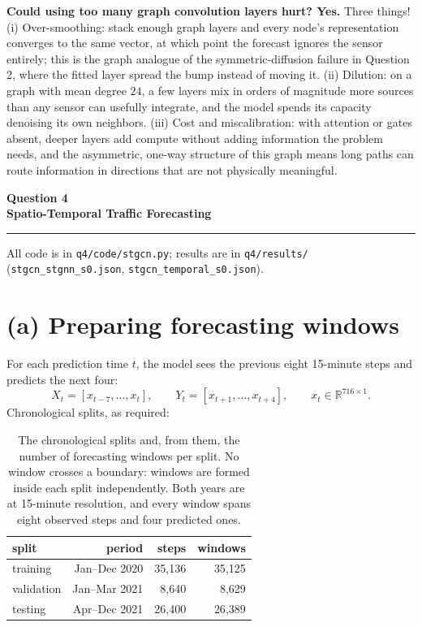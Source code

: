 \documentclass[11pt,letterpaper]{article}
\newcommand{\taskbanner}[2]{\begin{center}{\small\bfseries #1}\\[3pt]{\Large\bfseries #2}\end{center}\vspace{2pt}\hrule\vspace{8pt}}
\begin{document}
\textbf{Could using too many graph convolution layers hurt? Yes.} Three things! (i) Over-smoothing: stack enough graph layers and every node's representation
converges to the same vector, at which point the forecast ignores the sensor entirely; this is
the graph analogue of the symmetric-diffusion failure in Question 2, where the fitted layer
spread the bump instead of moving it. (ii) Dilution: on a graph with mean degree $24$, a few
layers mix in orders of magnitude more sources than any sensor can usefully integrate, and
the model spends its capacity denoising its own neighbors. (iii) Cost and miscalibration:
with attention or gates absent, deeper layers add compute without adding information the
problem needs, and the asymmetric, one-way structure of this graph means long paths can route
information in directions that are not physically meaningful.

\newpage

\taskbanner{Question 4}{Spatio-Temporal Traffic Forecasting}

All code is in \texttt{q4/code/stgcn.py}; results are in \texttt{q4/results/}
(\texttt{stgcn\_stgnn\_s0.json}, \texttt{stgcn\_temporal\_s0.json}).

\section*{(a) Preparing forecasting windows}

For each prediction time $t$, the model sees the previous eight 15-minute steps and
predicts the next four:
\begin{equation*}
X_t = [x_{t-7}, \dots, x_t], \qquad Y_t = [x_{t+1}, \dots, x_{t+4}], \qquad x_t \in \mathbb{R}^{716 \times 1}.
\end{equation*}
Chronological splits, as required:
\begin{table}[htbp]
\centering
\small
\begin{tabular}{@{}lrrr@{}}
\toprule
\textbf{split} & \textbf{period} & \textbf{steps} & \textbf{windows} \\
\midrule
training & Jan--Dec 2020 & 35{,}136 & 35{,}125 \\
validation & Jan--Mar 2021 & 8{,}640 & 8{,}629 \\
testing & Apr--Dec 2021 & 26{,}400 & 26{,}389 \\
\bottomrule
\end{tabular}
\caption{The chronological splits and, from them, the number of forecasting windows per
split. No window crosses a boundary: windows are formed inside each split independently.
Both years are at 15-minute resolution, and every window spans eight observed steps and
four predicted ones.}
\label{tab:splits}
\end{table}
\end{document}
